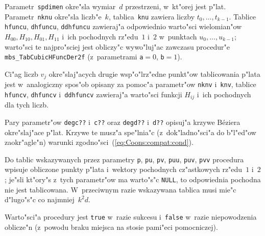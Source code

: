 Parametr~\texttt{spdimen} okre"sla wymiar~$d$ przestrzeni, w~kt"orej jest
p"lat. Parametr~\texttt{nknu} okre"sla liczb"e~$k$, tablica~\texttt{knu}
zawiera liczby $t_0,\ldots,t_{k-1}$. Tablice \texttt{hfuncu},
\texttt{dhfuncu},
\texttt{ddhfuncu} zawieraj"a odpowiednio warto"sci wielomian"ow
$H_{00},H_{10},H_{01},H_{11}$ i~ich pochodnych rz"edu~$1$ i~$2$ w~punktach
$u_0,\ldots,u_{k-1}$; warto"sci te najpro"sciej jest obliczy"c
wywo"luj"ac zawczasu procedur"e \texttt{mbs\_TabCubicHFuncDer2f}
(z~parametrami \texttt{a}${}=0$, \texttt{b}${}=1$).

Ci"ag liczb $v_j$ okre"slaj"acych drugie wsp"o"lrz"edne punkt"ow
tablicowania p"lata jest w~analogiczny spos"ob opisany za pomoc"a
parametr"ow \texttt{nknv} i~\texttt{knv}, tablice \texttt{hfuncv},
\texttt{dhfuncv} i~\texttt{ddhfuncv} zawieraj"a warto"sci funkcji $H_{ij}$
i~ich pochodnych dla tych liczb.

Pary parametr"ow \texttt{degc??} i~\texttt{c??} oraz \texttt{degd??}
i~\texttt{d??} opisuj"a krzywe B\'{e}ziera okre"slaj"ace p"lat.
Krzywe te musz"a spe"lnia"c (z~dok"ladno"sci"a do b"l"ed"ow zaokr"agle"n)
warunki zgodno"sci~(\ref{eq:Coons:compat:cond}).

Do tablic wskazywanych przez parametry \texttt{p}, \texttt{pu}, \texttt{pv},
\texttt{puu}, \texttt{puv}, \texttt{pvv} procedura wpisuje obliczone punkty
p"lata i~wektory pochodnych cz"astkowych rz"edu~$1$ i~$2$; je"sli kt"ory"s
z~tych parametr"ow ma warto"s"c \texttt{NULL}, to odpowiednia pochodna
nie jest tablicowana. W~przeciwnym razie wskazywana tablica musi mie"c
d"lugo"s"c co najmniej~$k^2d$.

Warto"sci"a procedury jest \texttt{true} w~razie sukcesu i~\texttt{false}
w~razie niepowodzenia oblicze"n (z~powodu braku miejsca na stosie
pami"eci pomocniczej).

